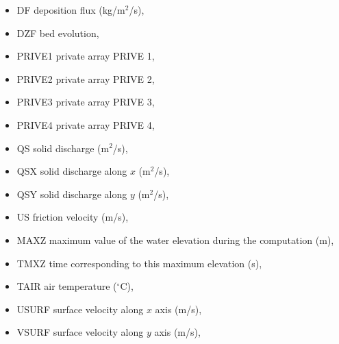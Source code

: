 \begin{itemize}
\item DF deposition flux (kg/m${}^{2}$/s),

\item DZF bed evolution,

\item PRIVE1 private array PRIVE 1,

\item PRIVE2 private array PRIVE 2,

\item PRIVE3 private array PRIVE 3,

\item PRIVE4 private array PRIVE 4,

\item QS  solid discharge (m${}^{2}$/s),

\item QSX  solid discharge along $x$ (m${}^{2}$/s),

\item QSY  solid discharge along $y$ (m${}^{2}$/s),

\item US  friction velocity (m/s),

\item MAXZ  maximum value of the water elevation during the computation (m),

\item TMXZ  time corresponding to this maximum elevation (s),








\item TAIR  air temperature ($^{\circ}$C),

\item USURF surface velocity along $x$ axis (m/s),

\item VSURF surface velocity along $y$ axis (m/s),


\end{itemize}
